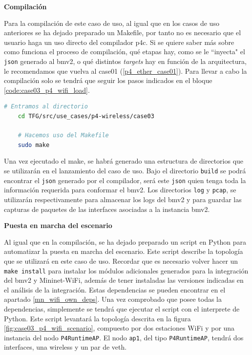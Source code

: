 \vspace{0.2cm}
\textbf{Compilación}\\
\par

Para la compilación de este caso de uso, al igual que en los casos de uso anteriores se ha dejado preparado un Makefile, por tanto no es necesario que el usuario haga un uso directo del compilador p4c. Si se quiere saber más sobre como funciona el proceso de compilación, qué etapas hay, como se le ``inyecta" el \texttt{json} generado al \gls{bmv2}, o qué distintos \textit{targets} hay en función de la arquitectura, le recomendamos que vuelva al case01 (\ref{p4_ether_case01}). Para llevar a cabo la compilación solo se tendrá que seguir los pasos indicados en el bloque \ref{code:case03_p4_wifi_load}.

\newpage

\begin{lstlisting}[language= bash, style=Consola, caption={Compilación programa P4  - Case03},label=code:case03_p4_wifi_load]
    # Entramos al directorio 
    cd TFG/src/use_cases/p4-wireless/case03

    # Hacemos uso del Makefile
    sudo make
\end{lstlisting}
\vspace{0.3cm}


Una vez ejecutado el make, se habrá generado una estructura de directorios que se utilizarán en el lanzamiento del caso de uso. Bajo el directorio \texttt{build} se podrá encontrar el \texttt{json} generado por el compilador, será este \texttt{json} quien tenga toda la información requerida para conformar el \gls{bmv2}. Los directorios \texttt{log} y \texttt{pcap}, se utilizarán respectivamente para almacenar los logs del \gls{bmv2} y para guardar las capturas de paquetes de las interfaces asociadas a la instancia \gls{bmv2}.\\
\par



\vspace{0.2cm}
\textbf{Puesta en marcha del escenario}\\
\par

Al igual que en la compilación, se ha dejado preparado un script en Python para automatizar la puesta en marcha del escenario. Este script describe la topología que se utilizará en este caso de uso. Recordar que es necesario volver hacer un \texttt{make install} para instalar los módulos adicionales generados para la integración del \gls{bmv2} y Mininet-WiFi, además de tener instaladas las versiones indicadas en el análisis de la integración. Estas dependencias se pueden encontrar en el apartado \ref{mn_wifi_own_deps}. Una vez comprobado que posee todas la dependencias, simplemente se tendrá que ejecutar el script con el interprete de Python. Este script levantará la topología descrita en la figura \ref{fig:case03_p4_wifi_scenario}, compuesto por dos estaciones WiFi y por una instancia del nodo \texttt{P4RuntimeAP}. El nodo \texttt{ap1}, del tipo \texttt{P4RuntimeAP}, tendrá dos interfaces, una wireless y un par de \gls{veth}.


